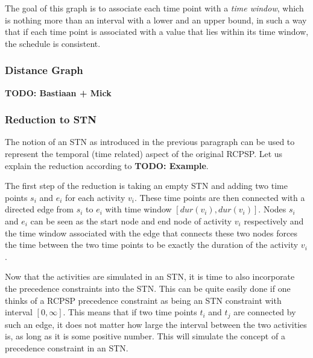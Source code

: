 \documentclass{article}
\theoremstyle{definition}
\newcommand{\TODO}[1]{{\color{red}\textbf{TODO: #1}}}
\newcommand{\dur}[1]{\ensuremath{dur(v_{#1})}} %
\begin{document}

The goal of this graph is to associate each time point with a \emph{time window}, which is nothing more than an interval with a lower and an upper bound, in such a way that if each time point is associated with a value that lies within its time window, the schedule is consistent.

\subsubsection{Distance Graph}


\TODO{Bastiaan + Mick}


\subsubsection{Reduction to STN}
The notion of an STN as introduced in the previous paragraph can be used to represent the temporal (time related) aspect of the original RCPSP. Let us explain the reduction according to \TODO{Example}.

The first step of the reduction is taking an empty STN and adding two time points $s_i$ and $e_i$ for each activity $v_i$. 
These time points are then connected with a directed edge from $s_i$ to $e_i$ with time window $[\dur{i}, \dur{i}]$. 
Nodes $s_i$ and $e_i$ can be seen as the start node and end node of activity $v_i$ respectively and the time window associated with the edge that connects these two nodes forces the time between the two time points to be exactly the duration of the activity $v_i$.

Now that the activities are simulated in an STN, it is time to also incorporate the precedence constraints into the STN. This can be quite easily done if one thinks of a RCPSP precedence constraint as being an STN constraint with interval $[0,\infty]$. This means that if two time points $t_i$ and $t_j$ are connected by such an edge, it does not matter how large the interval between the two activities is, as long as it is some positive number. This will simulate the concept of a precedence constraint in an STN.
\end{document}
